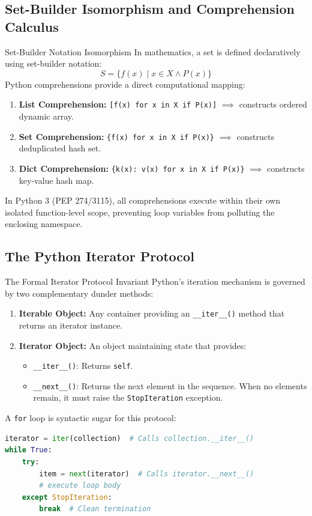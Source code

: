 \subsection{Set-Builder Isomorphism and Comprehension Calculus}

\begin{definitionbox}{Set-Builder Notation Isomorphism}
 
In mathematics, a set is defined declaratively using set-builder notation:
\begin{equation}
S = \{ f(x) \mid x \in X \land P(x) \}
\end{equation}
Python comprehensions provide a direct computational mapping:
\begin{enumerate}
    \item \textbf{List Comprehension:} \texttt{[f(x) for x in X if P(x)]} $\implies$ constructs ordered dynamic array.
    \item \textbf{Set Comprehension:} \texttt{\{f(x) for x in X if P(x)\}} $\implies$ constructs deduplicated hash set.
    \item \textbf{Dict Comprehension:} \texttt{\{k(x): v(x) for x in X if P(x)\}} $\implies$ constructs key-value hash map.
\end{enumerate}
In Python 3 (PEP 274/3115), all comprehensions execute within their own isolated function-level scope, preventing loop variables from polluting the enclosing namespace.
\end{definitionbox}

\subsection{The Python Iterator Protocol}

\begin{theorembox}{The Formal Iterator Protocol Invariant}
 
Python's iteration mechanism is governed by two complementary dunder methods:
\begin{enumerate}
    \item \textbf{Iterable Object:} Any container providing an \texttt{\_\_iter\_\_()} method that returns an iterator instance.
    \item \textbf{Iterator Object:} An object maintaining state that provides:
    \begin{itemize}
        \item \texttt{\_\_iter\_\_()}: Returns \texttt{self}.
        \item \texttt{\_\_next\_\_()}: Returns the next element in the sequence. When no elements remain, it must raise the \texttt{StopIteration} exception.
    \end{itemize}
\end{enumerate}
A \texttt{for} loop is syntactic sugar for this protocol:
\begin{lstlisting}[language=Python]
iterator = iter(collection)  # Calls collection.__iter__()
while True:
    try:
        item = next(iterator)  # Calls iterator.__next__()
        # execute loop body
    except StopIteration:
        break  # Clean termination
\end{lstlisting}
\end{theorembox}


